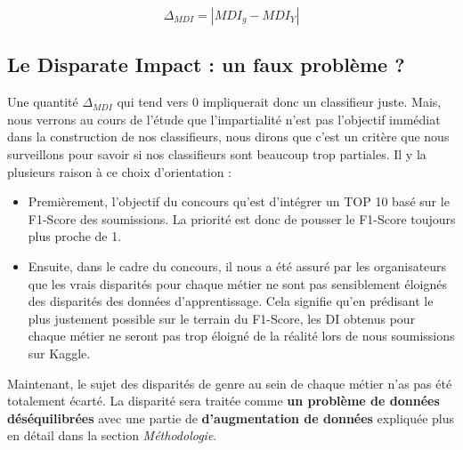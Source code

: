 $$ \Delta_{MDI} = | MDI_{g}- MDI_{Y} | $$

\subsection{Le Disparate Impact : un faux problème ?} \hfill
\newline

Une quantité $\Delta_{MDI}$ qui tend vers 0 impliquerait donc un classifieur juste. Mais, nous verrons au cours de l'étude que l'impartialité n'est pas l'objectif immédiat dans la construction de nos classifieurs, nous dirons que c'est un critère que nous surveillons pour savoir si nos classifieurs sont beaucoup trop partiales. Il y la plusieurs raison à ce choix d'orientation :

\begin{itemize}
\item Premièrement, l'objectif du concours qu'est d'intégrer un TOP 10 basé sur le F1-Score des soumissions. La priorité est donc de pousser le F1-Score toujours plus proche de 1.
\item Ensuite, dans le cadre du concours, il nous a été assuré par les organisateurs que les vrais disparités pour chaque métier ne sont pas sensiblement éloignés des disparités des données d'apprentissage. Cela signifie qu'en prédisant le plus justement possible sur le terrain du F1-Score, les DI obtenus pour chaque métier ne seront pas trop éloigné de la réalité lors de nous soumissions sur Kaggle.
\end{itemize}

\hfill

Maintenant, le sujet des disparités de genre au sein de chaque métier n'as pas été totalement écarté. La disparité sera traitée comme \textbf{un problème de données déséquilibrées} avec une partie de \textbf{d'augmentation de données} expliquée plus en détail dans la section \emph{Méthodologie}.


